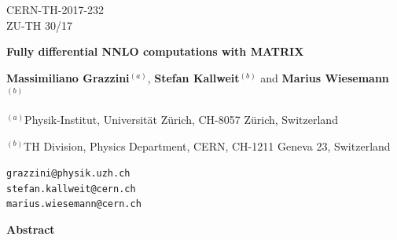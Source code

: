 \documentclass[english,11pt]{article}
\begin{document}
\begin{titlepage}




\begin{flushright}
CERN-TH-2017-232\\
ZU-TH 30/17
\end{flushright}
\vspace*{2cm}

\begin{center}
{\Large \bf Fully differential NNLO computations with {MATRIX}}
\end{center}
\par \vspace{2mm}
\begin{center}
{\bf Massimiliano Grazzini$^{(a)}$}, {\bf Stefan Kallweit$^{(b)}$} and {\bf Marius Wiesemann$^{(b)}$}\\[0.2cm]
\vspace{5mm}

$^{(a)}$Physik-Institut, Universit\"at Z\"urich, CH-8057 Z\"urich, Switzerland

$^{(b)}$TH Division, Physics Department, CERN, CH-1211 Geneva 23, Switzerland

\vskip 0.5cm
{\small\tt grazzini@physik.uzh.ch}\\[-0.1em]
{\small\tt stefan.kallweit@cern.ch}\\[-0.1em]
{\small\tt marius.wiesemann@cern.ch}\\[0.7em]





\vspace{5mm}

\end{center}

\par \vspace{2mm}
\begin{center} {\large \bf Abstract} \end{center}
\begin{quote}


\end{quote}
\end{titlepage}
\end{document}

